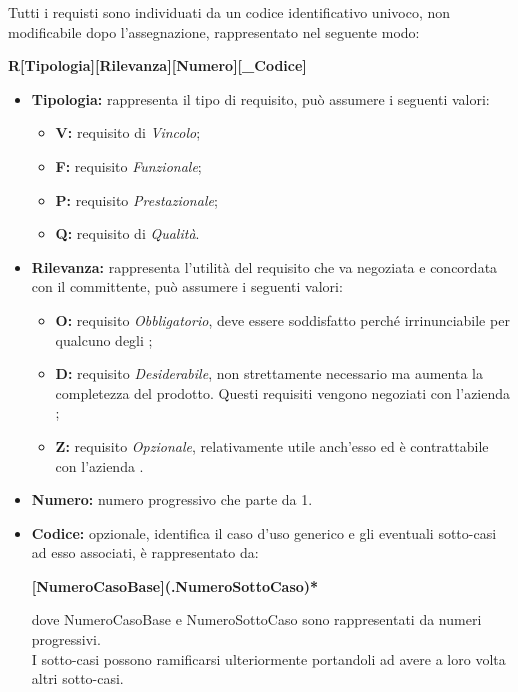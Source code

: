 \label{ClassificazioneRequisiti}Tutti i requisti sono individuati da un codice identificativo univoco, non modificabile dopo l'assegnazione, rappresentato nel seguente modo:

\begin{center}
	\textbf{R[Tipologia][Rilevanza][Numero][\_Codice]}
\end{center}

\begin{itemize}
	\item \textbf{Tipologia:} rappresenta il tipo di requisito, può assumere i seguenti valori:
	\begin{itemize}
		\item \textbf{V:} requisito di \textit{Vincolo};
		\item \textbf{F:} requisito \textit{Funzionale};
		\item \textbf{P:} requisito \textit{Prestazionale};
		\item \textbf{Q:} requisito di \textit{Qualità}.
	\end{itemize}

	\item \textbf{Rilevanza:} rappresenta l'utilità del requisito che va negoziata e concordata con il committente, può assumere i seguenti valori:
	\begin{itemize}
		\item \textbf{O:} requisito \textit{Obbligatorio}, deve essere soddisfatto perché irrinunciabile per qualcuno degli ;
		\item \textbf{D:} requisito \textit{Desiderabile}, non strettamente necessario ma aumenta la completezza del prodotto. Questi requisiti vengono negoziati con l'azienda \Proponente;
		\item \textbf{Z:} requisito \textit{Opzionale}, relativamente utile anch'esso ed è contrattabile con l'azienda \Proponente.
	\end{itemize}

	\item \textbf{Numero:} numero progressivo che parte da 1.
	\item \textbf{Codice:} opzionale, identifica il caso d'uso generico e gli eventuali sotto-casi ad esso associati, è rappresentato da:
	\begin{center}
		\textbf{[NumeroCasoBase](.NumeroSottoCaso)*}
	\end{center}
	dove NumeroCasoBase e NumeroSottoCaso sono rappresentati da numeri progressivi. \\
	I sotto-casi possono ramificarsi ulteriormente portandoli ad avere a loro volta altri sotto-casi.
\end{itemize}

